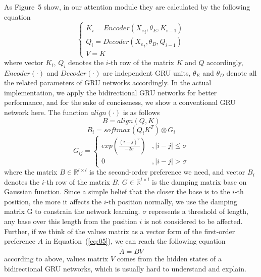\documentclass{bioinfo}
\begin{document}
As Figure~5\vphantom{\ref{fig:05}} show, in our attention module they are calculated by the following equation
\begin{equation}
\left\{\begin{array}{l}
K_i=Encoder({X_e}_i,\theta_E,K_{i-1})
\\ Q_i=Decoder({X_e}_i,\theta_D,Q_{i-1})
\\V=K 
\end{array}\right.\label{eq:14}
\end{equation}
where vector $K_i$, $Q_i$ denotes the $i$-th row of the matrix $K$ and $Q$ accordingly, $Encoder(\cdot)$ and $Decoder(\cdot)$ are independent GRU units, $\theta_E$ and $\theta_D$ denote all the related parameters of GRU networks accordingly. 
In the actual implementation, we apply the bidirectional GRU networks for better performance, and for the sake of conciseness, we show a conventional GRU network here. 
The function $align(\cdot)$ is as follows
\begin{equation}
B=align(Q,K)\label{eq:16}
\end{equation}
\begin{equation}
B_i=softmax(Q_iK^T)\otimes G_i\label{eq:17}
\end{equation}
\begin{equation}
G_{ij}=\left\{\begin{matrix}
exp(\frac{(i-j)^2}{-2\sigma})&,\left | i-j \right |\leqslant \sigma
\\ 0&,\left | i-j \right |>  \sigma
\end{matrix}\right.\label{eq:18}
\end{equation}
where the matrix $B\in\mathbb{R}^{l\times l}$ is the second-order preference we need, and vector $B_i$ denotes the $i$-th row of the matrix $B$. 
$G\in\mathbb{R}^{l\times l}$ is the damping matrix base on Gaussian function. 
Since a simple belief that the closer the base is to the $i$-th position, the more it affects the $i$-th position normally, we use the damping matrix G to constrain the network learning. 
$\sigma$ represents a threshold of length, any base over this length from the position $i$ is not considered to be affected.
Further, if we think of the values matrix as a vector form of the first-order preference $A$ in Equation~(\ref{eq:05}), we can reach the following equation
\begin{equation}
\tilde{A}=BV\label{eq:19}
\end{equation}
according to above, values matrix $V$ comes from the hidden states of a bidirectional GRU networks, which is usually hard to understand and explain.
\end{document}

